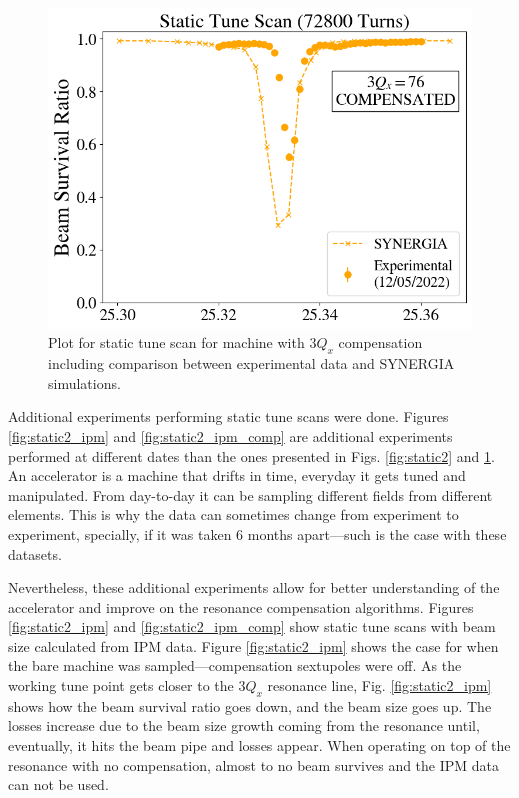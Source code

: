 \begin{figure}[H]
    \centering
    \includegraphics[width=\columnwidth]{chapter4/static2turns_comp.png}
    \caption{Plot for static tune scan for machine with $3Q_x$ compensation including comparison between experimental data and SYNERGIA simulations.}
    \label{fig:static2_comp}
\end{figure}

Additional experiments performing static tune scans were done. Figures \ref{fig:static2_ipm} and \ref{fig:static2_ipm_comp} are additional experiments performed at different dates than the ones presented in Figs. \ref{fig:static2} and \ref{fig:static2_comp}. An accelerator is a machine that drifts in time, everyday it gets tuned and manipulated. From day-to-day it can be sampling different fields from different elements. This is why the data can sometimes change from experiment to experiment, specially, if it was taken 6 months apart---such is the case with these datasets. 

Nevertheless, these additional experiments allow for better understanding of the accelerator and improve on the resonance compensation algorithms. Figures \ref{fig:static2_ipm} and \ref{fig:static2_ipm_comp} show static tune scans with beam size calculated from IPM data. Figure \ref{fig:static2_ipm} shows the case for when the bare machine was sampled---compensation sextupoles were off. As the working tune point gets closer to the $3Q_x$ resonance line, Fig. \ref{fig:static2_ipm} shows how the beam survival ratio goes down, and the beam size goes up. The losses increase due to the beam size growth coming from the resonance until, eventually, it hits the beam pipe and losses appear. When operating on top of the resonance with no compensation, almost to no beam survives and the IPM data can not be used. 

